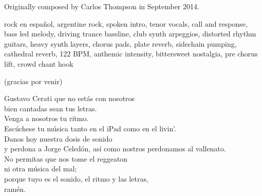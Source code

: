 
\begin{notes}
Originally composed by Carlos Thompson in September 2014.
\end{notes}
\begin{style}
rock en español, argentine rock, spoken intro, tenor vocals, call and response, bass led melody, driving trance bassline, club synth arpeggios, distorted rhythm guitars, heavy synth layers, chorus pads, plate reverb, sidechain pumping, cathedral reverb, 122 BPM, anthemic intensity, bittersweet nostalgia, pre chorus lift, crowd chant hook
\end{style}
\begin{lyrics}
(gracias por venir)

Gustavo Cerati que no estás con nosotros\\
bien cantadas sean tus letras.\\
Venga a nosotros tu ritmo.\\
Escúchese tu música tanto en el iPad como en el livin'.\\
Danos hoy nuestra dosis de sonido\\
y perdona a Jorge Celedón, así como nostros perdonamos al vallenato.\\
No permitas que nos tome el reggeaton\\
ni otra música del mal;\\
porque tuyo es el sonido, el ritmo y las letras,\\
ramén.
\end{lyrics}

